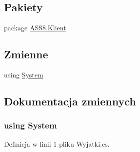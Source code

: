 \subsection*{Pakiety}
\begin{CompactItemize}
\item 
package \hyperlink{a00060}{ASS8.Klient}
\end{CompactItemize}
\subsection*{Zmienne}
\begin{CompactItemize}
\item 
﻿using \hyperlink{a00053_81a223a02c34d82b47199f08308847f2}{System}
\end{CompactItemize}


\subsection{Dokumentacja zmiennych}
\hypertarget{a00053_81a223a02c34d82b47199f08308847f2}{
\subsubsection[{System}]{\setlength{\rightskip}{0pt plus 5cm}﻿using {\bf System}}}
\label{dc/dee/a00053_81a223a02c34d82b47199f08308847f2}




Definicja w linii 1 pliku Wyjatki.cs.